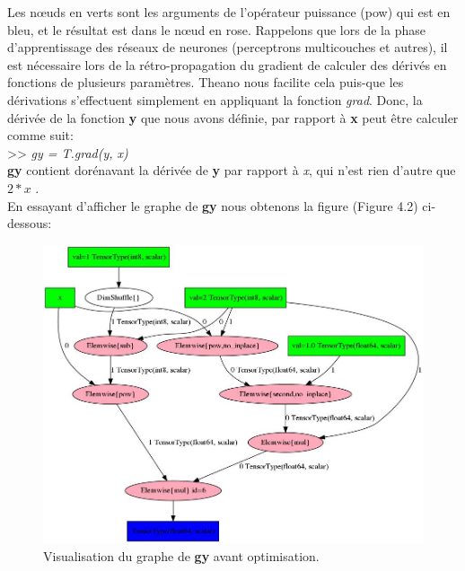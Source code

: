 	Les nœuds en verts sont les arguments de l'opérateur puissance (pow) qui est en bleu, et le résultat est dans le nœud en rose.
	Rappelons que lors de la phase d'apprentissage des réseaux de neurones (perceptrons multicouches et autres), il est nécessaire lors de la rétro-propagation du gradient de calculer des dérivés en fonctions de plusieurs paramètres. Theano nous facilite cela puis-que les dérivations s'effectuent simplement en appliquant la fonction \textit{grad}. 
Donc, la dérivée de la fonction \textbf{y} que nous avons définie, par rapport à \textbf{x} peut être calculer comme suit: \\

>> \textit{gy = T.grad(y, x)}\\

\textbf{gy} contient dorénavant la dérivée de \textbf{y} par rapport à \textit{x}, qui n'est rien d'autre que $2*x$ .\\

 
	En essayant d'afficher le graphe de \textbf{gy} nous obtenons la figure (Figure 4.2) ci-dessous:

\begin{figure}[H]
	\centering
		\includegraphics[width=5in]{Figures/beforeOptimization.png}
	\caption[TheanoGraph]{Visualisation du graphe de \textbf{gy} avant optimisation.}
	\label{fig:Electron}
\end{figure}

